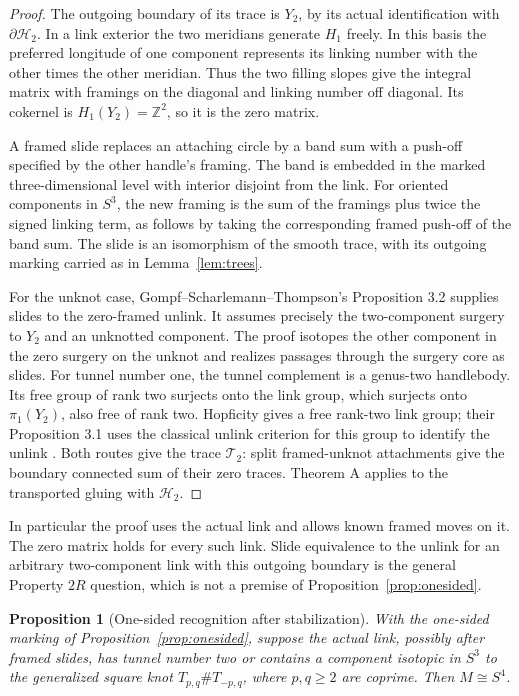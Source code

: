 \documentclass[11pt,letterpaper]{article}
\numberwithin{equation}{section}
\newtheorem{proposition}[theorem]{Proposition}
\newcommand{\HB}[1]{\mathcal H_{#1}}
\newcommand{\TB}[1]{\mathcal T_{#1}}
\begin{document}
\begin{proof}
The outgoing boundary of its trace is \(Y_2\), by its actual
identification with \(\partial\HB{2}\). In a link exterior the two
meridians generate \(H_1\) freely. In this basis the preferred
longitude of one component represents its linking number with
the other times the other meridian. Thus the two filling slopes
give the integral matrix with framings on the diagonal and
linking number off diagonal. Its cokernel is \(H_1(Y_2)=\mathbb Z^2\),
so it is the zero matrix.

A framed slide replaces an attaching circle by a band sum with
a push-off specified by the other handle's framing. The band
is embedded in the marked three-dimensional level with interior
disjoint from the link. For oriented components in \(S^3\), the
new framing is the sum of the framings plus twice the signed
linking term, as follows by taking the corresponding framed
push-off of the band sum. The slide is an isomorphism of the
smooth trace, with its outgoing marking carried as in
Lemma~\ref{lem:trees}.

For the unknot case, Gompf--Scharlemann--Thompson's
Proposition 3.2 supplies slides to the zero-framed unlink.
It assumes precisely the two-component surgery to \(Y_2\) and
an unknotted component. The proof isotopes the other component
in the zero surgery on the unknot and realizes passages through
the surgery core as slides. For tunnel number one, the tunnel
complement is a genus-two handlebody. Its free group of rank two
surjects onto the link group, which surjects onto \(\pi_1(Y_2)\),
also free of rank two. Hopficity gives a free rank-two link group;
their Proposition 3.1 uses the classical unlink criterion for
this group to identify the unlink
\cite[\S2 and Propositions 2.2, 3.1--3.2]{GompfScharlemannThompson2010}.
Both routes give the trace \(\TB{2}\): split framed-unknot
attachments give the boundary connected sum of their zero traces.
Theorem A applies to the transported gluing with \(\HB{2}\).
\end{proof}

In particular the proof uses the actual link and allows known
framed moves on it. The zero matrix holds for every such link.
Slide equivalence to the unlink for an arbitrary two-component
link with this outgoing boundary is the general Property \(2R\)
question, which is not a premise of Proposition~\ref{prop:onesided}.

\begin{proposition}[One-sided recognition after stabilization]\label{prop:onesided-stable}
With the one-sided marking of Proposition~\ref{prop:onesided},
suppose the actual link, possibly after framed slides, has tunnel number two
or contains a component isotopic in \(S^3\) to the generalized
square knot \(T_{p,q}\#T_{-p,q}\), where \(p,q\ge 2\) are coprime.
Then \(M\cong S^4\).
\end{proposition}
\end{document}
